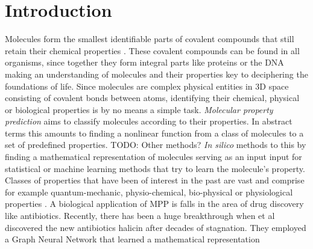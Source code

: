 \section{Introduction}\label{sec:inttroduction}
\noindent Molecules form the smallest identifiable parts of covalent compounds that still retain their chemical properties \cite{molecules}. These covalent compounds can be found in all organisms, since together they form integral parts like proteins or the DNA making an understanding of molecules and their properties key to deciphering the foundations of life. Since molecules are complex physical entities in 3D space consisting of covalent bonds between atoms, identifying their chemical, physical or biological properties is by no means a simple task. \emph{Molecular property prediction} aims to classify molecules according to their properties. In abstract terms this amounts to finding a nonlinear function from a class of molecules to a set of predefined properties. TODO: Other methods? \emph{In silico} methods to this by finding a mathematical representation of molecules serving as an input input for statistical or machine learning methods that try to learn the molecule's property. Classes of properties that have been of interest in the past are vast and comprise for example quantum-mechanic, physio-chemical, bio-physical or physiological properties \cite{wu2018moleculenet}. A biological application of MPP is falls in the area of drug discovery like antibiotics. Recently, there has been a huge breakthrough when et al discovered the new antibiotics halicin after decades of stagnation. They employed a Graph Neural Network that learned a mathematical representation 